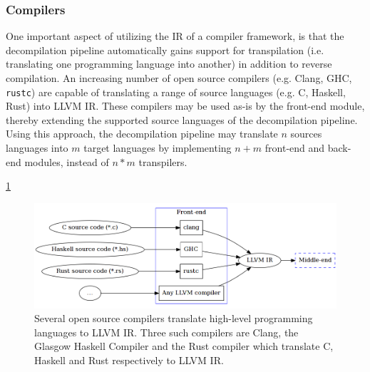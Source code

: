 
\subsubsection{Compilers}
\label{sec:compilers}


One important aspect of utilizing the IR of a compiler framework, is that the decompilation pipeline automatically gains support for transpilation (i.e. translating one programming language into another) in addition to reverse compilation. An increasing number of open source compilers (e.g. Clang, GHC, \texttt{rustc}) are capable of translating a range of source languages (e.g. C, Haskell, Rust) into LLVM IR. These compilers may be used as-is by the front-end module, thereby extending the supported source languages of the decompilation pipeline. Using this approach, the decompilation pipeline may translate $ n $ sources languages into $ m $ target languages by implementing $ n + m $ front-end and back-end modules, instead of $ n * m $ transpilers.


\ref{fig:front-end_source}

\begin{figure}[htbp]
	\begin{center}
		\includegraphics[width=\textwidth]{inc/front-end_source.png}
		\caption{Several open source compilers translate high-level programming languages to LLVM IR. Three such compilers are Clang, the Glasgow Haskell Compiler and the Rust compiler which translate C, Haskell and Rust respectively to LLVM IR.}
		\label{fig:front-end_source}
	\end{center}
\end{figure}
